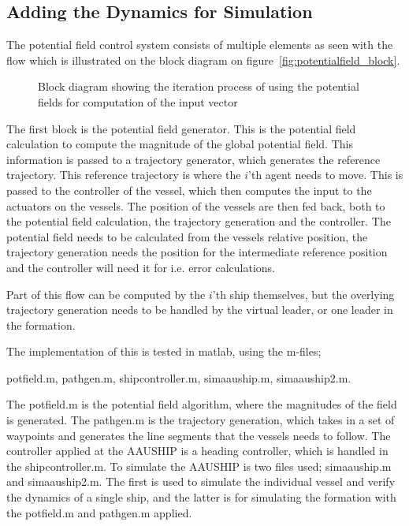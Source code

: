 \subsection{Adding the Dynamics for Simulation}
The potential field control system consists of multiple elements
as seen with the flow which is illustrated on the block diagram on
figure~\vref{fig:potentialfield_block}.
\begin{figure}[htbp]
\centering

\caption{Block diagram showing the iteration process of using the
potential fields for computation of the input vector}
\label{fig:potentialfield_block}
\end{figure}
The first block is the potential field generator. This is the potential field calculation to compute the magnitude of the global potential field. This information is passed to a trajectory generator, which generates the reference trajectory. This reference trajectory is where the $i$'th agent needs to move. This is passed to the controller of the vessel, which then computes the input to the actuators on the vessels. The position of the vessels are then fed back, both to the potential field calculation, the trajectory generation and the controller. The potential field needs to be calculated from the vessels relative position, the trajectory generation needs the position for the intermediate reference position and the controller will need it for i.e. error calculations.

Part of this flow can be computed by the $i$'th ship themselves, but the overlying trajectory generation needs to be handled by the virtual leader, or one leader in the formation.

The implementation of this is tested in matlab, using the m-files;

potfield.m, pathgen.m, shipcontroller.m, simaauship.m, simaauship2.m.

The potfield.m is the potential field algorithm, where the magnitudes of the field is generated. The pathgen.m is the trajectory generation, which takes in a set of waypoints and generates the line segments that the vessels needs to follow. The controller applied at the AAUSHIP is a heading controller, which is handled in the shipcontroller.m. To simulate the AAUSHIP is two files used; simaauship.m and simaauship2.m. The first is used to simulate the individual vessel and verify the dynamics of a single ship, and the latter is for simulating the formation with the potfield.m and pathgen.m applied.

